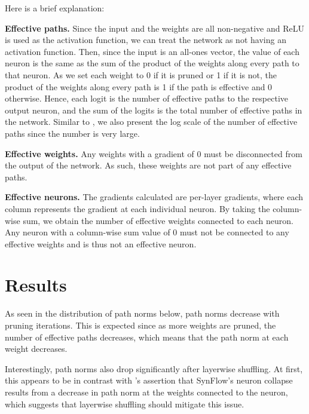 Here is a brief explanation:

\textbf{Effective paths.} Since the input and the weights are all non-negative and ReLU is used as the activation function, we can treat the network as not having an activation function. Then, since the input is an all-ones vector, the value of each neuron is the same as the sum of the product of the weights along every path to that neuron. As we set each weight to 0 if it is pruned or 1 if it is not, the product of the weights along every path is 1 if the path is effective and 0 otherwise. Hence, each logit is the number of effective paths to the respective output neuron, and the sum of the logits is the total number of effective paths in the network. Similar to \textcite{pham23}, we also present the log scale of the number of effective paths since the number is very large.

\textbf{Effective weights.} Any weights with a gradient of 0 must be disconnected from the output of the network. As such, these weights are not part of any effective paths.

\textbf{Effective neurons.} The gradients calculated are per-layer gradients, where each column represents the gradient at each individual neuron. By taking the column-wise sum, we obtain the number of effective weights connected to each neuron. Any neuron with a column-wise sum value of 0 must not be connected to any effective weights and is thus not an effective neuron.

\section{Results}
As seen in the distribution of path norms below, path norms decrease with pruning iterations. This is expected since as more weights are pruned, the number of effective paths decreases, which means that the path norm at each weight decreases.

Interestingly, path norms also drop significantly after layerwise shuffling. At first, this appears to be in contrast with \textcite{frankle21}'s assertion that SynFlow's neuron collapse results from a decrease in path norm at the weights connected to the neuron, which suggests that layerwise shuffling should mitigate this issue.

